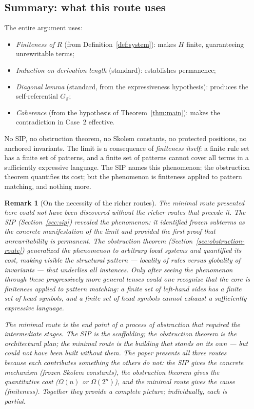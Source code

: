 \documentclass[11pt]{article}
\newtheorem{remark}[theorem]{Remark}
\begin{document}
\subsection{Summary: what this route uses}

The entire argument uses:
\begin{itemize}
  \item \emph{Finiteness of $R$} (from Definition~\ref{def:system}):
        makes $H$ finite, guaranteeing unrewritable terms;
  \item \emph{Induction on derivation length} (standard): establishes
        permanence;
  \item \emph{Diagonal lemma} (standard, from the expressiveness
        hypothesis): produces the self-referential $G_{\mathcal{S}}$;
  \item \emph{Coherence} (from the hypothesis of
        Theorem~\ref{thm:main}): makes the contradiction in Case~2
        effective.
\end{itemize}
No SIP, no obstruction theorem, no Skolem constants, no protected
positions, no anchored invariants. The limit is a consequence of
\emph{finiteness itself}: a finite rule set has a finite set of
patterns, and a finite set of patterns cannot cover all terms in a
sufficiently expressive language. The SIP names this phenomenon; the
obstruction theorem quantifies its cost; but the phenomenon is finiteness
applied to pattern matching, and nothing more.

\begin{remark}[On the necessity of the richer routes]
\label{rem:scaffolding}
The minimal route presented here could not have been discovered without
the richer routes that precede it. The SIP
(Section~\ref{sec:sip}) revealed the phenomenon: it identified frozen
subterms as the concrete manifestation of the limit and provided the
first proof that unrewritability is permanent. The obstruction theorem
(Section~\ref{sec:obstruction-route}) generalized the phenomenon to
arbitrary local systems and quantified its cost, making visible the
structural pattern --- locality of rules versus globality of invariants
--- that underlies all instances. Only after seeing the phenomenon
through these progressively more general lenses could one recognize that
the core is finiteness applied to pattern matching: a finite set of
left-hand sides has a finite set of head symbols, and a finite set of
head symbols cannot exhaust a sufficiently expressive language.

The minimal route is the end point of a process of abstraction that
required the intermediate stages. The SIP is the scaffolding; the
obstruction theorem is the architectural plan; the minimal route is the
building that stands on its own --- but could not have been built without
them. The paper presents all three routes because each contributes
something the others do not: the SIP gives the concrete mechanism (frozen
Skolem constants), the obstruction theorem gives the quantitative cost
($\Omega(n)$ or $\Omega(2^n)$), and the minimal route gives the cause
(finiteness). Together they provide a complete picture; individually,
each is partial.
\end{remark}
\end{document}
